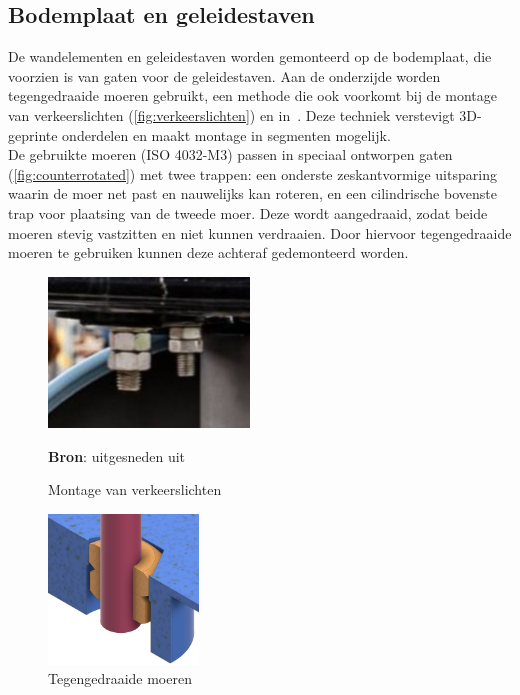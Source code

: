 \subsection{Bodemplaat en geleidestaven}
De wandelementen en geleidestaven worden gemonteerd op de bodemplaat, die voorzien is van gaten voor de geleidestaven. Aan de onderzijde worden tegengedraaide moeren gebruikt, een methode die ook voorkomt bij de montage van verkeerslichten (\autoref{fig:verkeerslichten}) en in\ \cite{RN40}. Deze techniek verstevigt 3D-geprinte onderdelen en maakt montage in segmenten mogelijk.
\\[12pt]De gebruikte moeren (ISO 4032-M3) passen in speciaal ontworpen gaten (\autoref{fig:counterrotated}) met twee trappen: een onderste zeskantvormige uitsparing waarin de moer net past en nauwelijks kan roteren, en een cilindrische bovenste trap voor plaatsing van de tweede moer. Deze wordt aangedraaid, zodat beide moeren stevig vastzitten en niet kunnen verdraaien. Door hiervoor tegengedraaide moeren te gebruiken kunnen deze achteraf gedemonteerd worden.
\\[12pt]\begin{minipage}[t]{0.49\textwidth}
    \vspace{0pt}
    \begin{figure}[H]
        \centering
        \captionsetup{width=1\textwidth} %
        \includegraphics[height=4cm]{figures/verkeerssituaties48.jpg}
        \caption{Montage van verkeerslichten}\label{fig:verkeerslichten}
        \textbf{Bron}: uitgesneden uit\ \cite{RN39}
    \end{figure}
\end{minipage}
\begin{minipage}[t]{0.49\textwidth}
    \begin{figure}[H]
        \centering
        \captionsetup{width=1\textwidth} %
        \includegraphics[height=4cm]{figures/InterlockingScrews.png}
        \caption{Tegengedraaide moeren}\label{fig:counterrotated}
    \end{figure}
\end{minipage}\\[12pt]
